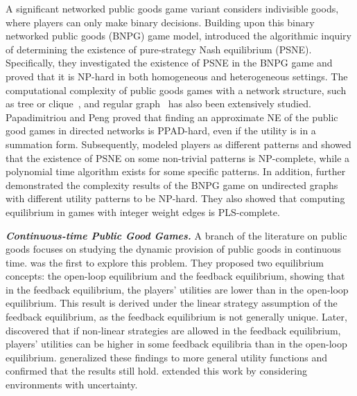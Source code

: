 A significant networked public goods game variant considers indivisible goods, where players can only make binary decisions\cite{galeotti2010network}. 
Building upon this binary networked public goods (BNPG) game model, \citet{yu2020computing} introduced the algorithmic inquiry of determining the existence of pure-strategy Nash equilibrium (PSNE). 
Specifically, they investigated the existence of PSNE in the BNPG game and proved that it is NP-hard in both homogeneous and heterogeneous settings.
The computational complexity of public goods games with a network structure, such as tree or clique~\cite{yang2020refined, maiti2024parameterized}, and regular graph~\cite{feldman2013pricing} has also been extensively studied.
Papadimitriou and Peng\cite{public-network-direct-complexity:papadimitriou2021public} proved that finding an approximate NE of the public good games in directed networks is PPAD-hard, even if the utility is in a summation form.
Subsequently, \citet{public-uncertainty:gilboa2022complexity} modeled players as different patterns and showed that the existence of PSNE on some non-trivial patterns is NP-complete, while a polynomial time algorithm exists for some specific patterns.
In addition, \citet{klimm2023complexity} further demonstrated the complexity results of the BNPG game on undirected graphs with different utility patterns to be NP-hard. 
They also showed that computing equilibrium in games with integer weight edges is PLS-complete.

\emph{\bf Continuous-time Public Good Games.}
A branch of the literature on public goods focuses on studying the dynamic provision of public goods in continuous time. \citet{public-dynamic:fershtman1991dynamic} was the first to explore this problem. They proposed two equilibrium concepts: the open-loop equilibrium and the feedback equilibrium, showing that in the feedback equilibrium, the players' utilities are lower than in the open-loop equilibrium. This result is derived under the linear strategy assumption of the feedback equilibrium, as the feedback equilibrium is not generally unique. Later, \citet{public-dynamic-nonlinear:wirl1996dynamic} discovered that if non-linear strategies are allowed in the feedback equilibrium, players' utilities can be higher in some feedback equilibria than in the open-loop equilibrium. \citet{public-dynamic-CES:fujiwara2009dynamic} generalized these findings to more general utility functions and confirmed that the results still hold. \citet{public-dynamic-uncertain:wang2010dynamic} extended this work by considering environments with uncertainty.

